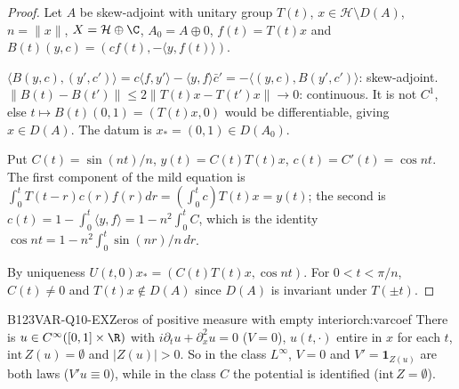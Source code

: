 \begin{proof}
Let $A$ be skew-adjoint with unitary group $T(t)$, $x\in\mathcal H\setminus D(A)$, $n=\|x\|$, $X=\mathcal H\oplus\C$, $A_0=A\oplus0$, $f(t)=T(t)x$ and $B(t)(y,c)=(cf(t),-\langle y,f(t)\rangle)$.

$\langle B(y,c),(y',c')\rangle=c\langle f,y'\rangle-\langle y,f\rangle\bar c'=-\langle(y,c),B(y',c')\rangle$: skew-adjoint. $\|B(t)-B(t')\|\le2\|T(t)x-T(t')x\|\to0$: continuous. It is not $C^1$, else $t\mapsto B(t)(0,1)=(T(t)x,0)$ would be differentiable, giving $x\in D(A)$. The datum is $x_*=(0,1)\in D(A_0)$.

Put $C(t)=\sin(nt)/n$, $y(t)=C(t)T(t)x$, $c(t)=C'(t)=\cos nt$. The first component of the mild equation is $\int_0^tT(t-r)c(r)f(r)dr=(\int_0^tc)T(t)x=y(t)$; the second is $c(t)=1-\int_0^t\langle y,f\rangle=1-n^2\int_0^tC$, which is the identity $\cos nt=1-n^2\int_0^t\sin(nr)/n\,dr$.

By uniqueness $U(t,0)x_*=(C(t)T(t)x,\cos nt)$. For $0<t<\pi/n$, $C(t)\ne0$ and $T(t)x\notin D(A)$ since $D(A)$ is invariant under $T(\pm t)$.

\end{proof}

\begin{dimcard}{B123}{VAR-Q10-EX}{Zeros of positive measure with empty interior}{\pw}{ch:varcoef}
There is $u\in C^\infty([0,1]\times\R)$ with $i\partial_tu+\partial_x^2u=0$ ($V=0$), $u(t,\cdot)$ entire in $x$ for each $t$, $\mathrm{int}\,Z(u)=\emptyset$ and $|Z(u)|>0$. So in the class $L^\infty$, $V=0$ and $V'=\mathbf 1_{Z(u)}$ are both laws ($V'u\equiv0$), while in the class $C$ the potential is identified ($\mathrm{int}\,Z=\emptyset$).
\end{dimcard}

